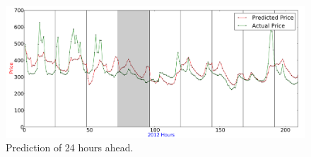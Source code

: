 \begin{figure}[H]
\centering
\includegraphics[width=\linewidth,natwidth=898,natheight=587]{billeder/PriceExperimentalAnalysis/24HoursAhead_ElevationOfErrorExample.png}
\caption{Prediction of 24 hours ahead.}
\label{fig:24HoursAhead_elevationOfError}
\end{figure}

